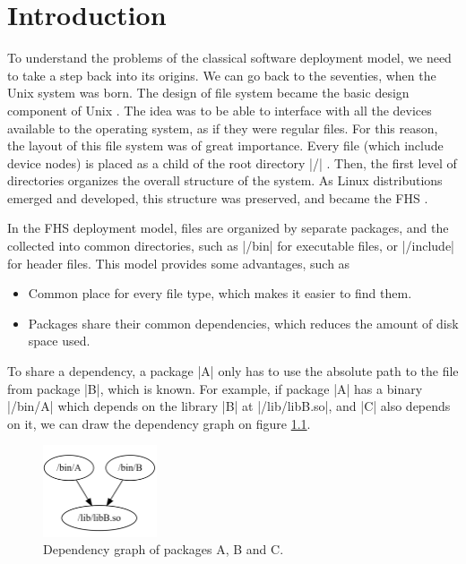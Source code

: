 \chapter{Introduction}


To understand the problems of the classical software deployment model, we need
to take a step back into its origins. We can go back to the seventies, when the
Unix system was born. The design of file system became the basic design
component of Unix  \cite{ritchieUNIXSystemEvolution1984} . The idea was to be able to interface
with all the devices available to the operating system, as if they were regular
files. For this reason, the layout of this file system was of great importance.
Every file (which include device nodes) is placed as a child of the root
directory |/| . Then, the first level of directories organizes the overall
structure of the system. As Linux distributions emerged and developed, this
structure was preserved, and became the \ac{FHS}
\cite{FHSLinuxFoundation}.

In the \ac{FHS} deployment model, files are organized by separate packages, and the
collected into common directories, such as |/bin| for executable files, or
|/include| for header files. This model provides some advantages, such as

\begin{itemize}
    \item Common place for every file type, which makes it easier to
        find them.
    \item Packages share their common dependencies, which reduces the
        amount of disk space used.
\end{itemize}

To share a dependency, a package |A| only has to use the absolute path to the
file from package |B|, which is known. For example, if package |A| has a binary
|/bin/A| which depends on the library |B| at |/lib/libB.so|, and |C| also
depends on it, we can draw the dependency graph on figure \ref{fig:graph1}.

\begin{figure}
    \centering
    \includegraphics[width=0.3\textwidth]{Screenshot 2023-05-29 150312.png}
    \caption{Dependency graph of packages A, B and C.}
    \label{fig:graph1}
\end{figure}

